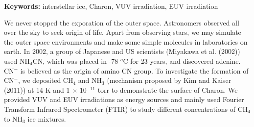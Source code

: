 \begin{abstracten}

{\bf \sf Keywords:} interstellar ice, Charon, VUV irradiation, EUV irradiation

\vspace{2em}

We never stopped the exporation of the outer space. Astronomers observed all over the sky to seek origin of life. Apart from observing stars, we may simulate the outer space environments and make some simple molecules in laboratories on earth. In 2002, a group of Japanese and US scientists (Miyakawa et al. (2002)\cite{miyakawa2002cold}) used NH$_4$CN, which was placed in -78 $^o$C for 23 years, and discovered adenine. CN$^-$ is believed as the origin of amino CN group. To investigate the formation of CN$^-$, we deposited CH$_4$ and NH$_3$ (mechanism proposed by Kim and Kaiser (2011)\cite{kim}) at 14 K and 1 $\times$ 10$^{-11}$ torr to demonstrate the surface of Charon. We provided VUV and EUV irradiations as energy sources and mainly used Fourier Transform Infrared Spectrometer (FTIR) to study different concentrations of CH$_4$ to NH$_3$ ice mixtures.


\end{abstracten} 

